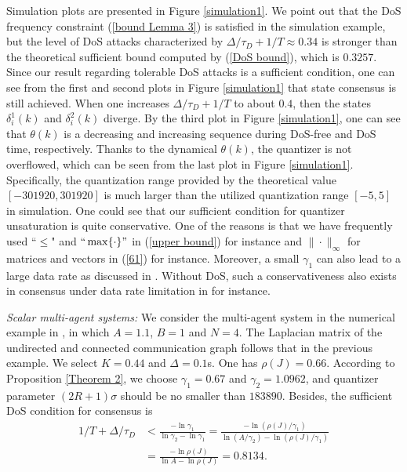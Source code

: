 \documentclass[letterpaper,journal,final,twocolumn]{IEEEtran}
\begin{document}
Simulation plots are presented in Figure \ref{simulation1}. We point out that the DoS frequency constraint (\ref{bound Lemma 3}) is satisfied in the simulation example, but the level of DoS attacks characterized by $
\Delta/\tau_D + 1/T \approx 0.34
$ is stronger than the theoretical sufficient bound computed by (\ref{DoS bound}), which is $0.3257$. Since our result regarding tolerable DoS attacks is a sufficient condition, one can see from the first and second plots in Figure \ref{simulation1} that state consensus is still achieved. When one increases $
\Delta/\tau_D + 1/T$ to about $0.4$, then the states $\delta_i^1(k)$ and $\delta_i^2(k)$ diverge.  
By the third plot in Figure \ref{simulation1}, one can see that $\theta(k)$ is a decreasing and increasing sequence during DoS-free and DoS time, respectively. Thanks to the dynamical $\theta(k)$, the quantizer is not overflowed, which can be seen from the last plot in Figure \ref{simulation1}. Specifically, the quantization range provided by the theoretical value $[-301920, 301920]$ is much larger than the utilized quantization range $[-5, 5]$ in simulation. One could see that our sufficient condition for quantizer unsaturation is quite conservative. 
One of the reasons is that we have frequently used ``$\le$" and $``\max\{\cdot\}"$ in (\ref{upper bound}) for instance and $\|\cdot\|_\infty$ for matrices and vectors in (\ref{61}) for instance. Moreover, a small $\gamma_1$ can also lead to a large data rate as discussed in \cite{feng2020arxiv}. Without DoS, such a conservativeness also exists in consensus under data rate limitation in \cite{you2011network, li2010distributed} for instance.  








\emph{Scalar multi-agent systems:}
We consider the multi-agent system in the numerical example in \cite{you2011network}, in which $A=1.1$, $B=1$ and $N=4$. The Laplacian matrix of the undirected and connected communication graph follows that in the previous example.
We select $K=0.44$ and $\Delta = 0.1$s. One has $\rho(J)=0.66$. According to Proposition \ref{Theorem 2}, we choose $\gamma_1=0.67$ and $\gamma_2=1.0962$, and quantizer parameter $(2R + 1)\sigma$ should be no smaller than $183890$. Besides, the sufficient DoS condition for consensus is 
\begin{align}\label{72}
\!\!\!1/T + \Delta / \tau_D  &< \frac{-\ln \gamma_1}{\ln \gamma_2 \!- \! \ln \gamma_1} =\!   \frac{- \ln (\rho(J)/ \gamma_1)  }{\ln (A/\gamma_2)  - \ln (\rho(J)/ \gamma_1) } \nonumber\\ &\! =\!
\frac{-\ln \rho(J)}{\ln A - \ln \rho(J)} 
=  0.8134.
\end{align}
\end{document}
